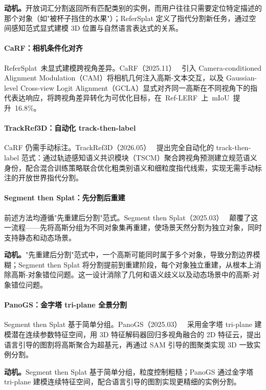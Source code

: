 \textbf{动机。}开放词汇分割返回所有匹配类别的实例，而用户往往只需要定位特定描述的那个对象（如"被杯子挡住的水果"）；ReferSplat 定义了指代分割新任务，通过空间感知范式显式建模 3D 位置与自然语言表达式的关系。

\paragraph{CaRF：相机条件化对齐} ReferSplat~未显式建模跨视角差异。CaRF（2025.11）~\cite{2511_03992} 引入 Camera-conditioned Alignment Modulation（CAM）将相机几何注入高斯-文本交互，以及 Gaussian-level Cross-view Logit Alignment（GCLA）显式对齐同一高斯在不同视角下的指代表达响应，将跨视角差异转化为可优化目标，在~Ref-LERF~上~mIoU~提升~16.8\%。

\paragraph{TrackRef3D：自动化 track-then-label} CaRF 仍需手动标注。TrackRef3D（2026.05）~\cite{2605_26576} 提出完全自动化的 track-then-label 范式：通过轨迹感知语义共识模块（TSCM）聚合跨视角预测建立规范语义身份，配合混合训练策略联合优化粗类别语义和细粒度指代线索，实现无需手动标注的开放世界指代分割。

\paragraph{Segment then Splat：先分割后重建} 前述方法均遵循"先重建后分割"范式。Segment then Splat（2025.03）~\cite{2503_22204} 颠覆了这一流程——先将高斯分组为不同对象集再重建，使场景天然分割为独立对象，同时支持静态和动态场景。

\textbf{动机。}"先重建后分割"范式中，一个高斯可能同时属于多个对象，导致分割边界模糊；Segment then Splat 将分割提前到重建阶段，每个对象独立重建，从根本上消除高斯-对象错位问题。这一设计消除了几何和语义歧义以及动态场景中的高斯-对象错位问题。

\paragraph{PanoGS：金字塔 tri-plane 全景分割} Segment then Splat 基于简单分组。PanoGS（2025.03）~\cite{2503_18107} 采用金字塔 tri-plane 建模潜在连续参数特征空间，用 3D 特征解码器回归多视角融合的 2D 特征云，提出语言引导的图割将高斯聚合为超基元，再通过 SAM 引导的图聚类实现 3D 一致实例分割。

\textbf{动机。}Segment then Splat 基于简单分组，粒度控制粗糙；PanoGS 通过金字塔 tri-plane 建模连续特征空间，配合语言引导的图割实现更精细的实例分割。

